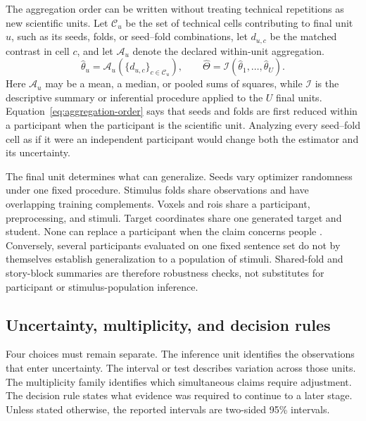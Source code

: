 The aggregation order can be written without treating technical repetitions as new scientific units.
Let \(\mathcal C_u\) be the set of technical cells contributing to final unit \(u\), such as its seeds, folds, or seed--fold combinations, let \(d_{u,c}\) be the matched contrast in cell \(c\), and let \(\mathcal A_u\) denote the declared within-unit aggregation.
\begin{equation}
  \widehat\theta_u
  =
  \mathcal A_u\!\left(\{d_{u,c}\}_{c\in\mathcal C_u}\right),
  \qquad
  \widehat\Theta
  =
  \mathcal I\!\left(\widehat\theta_1,\ldots,\widehat\theta_U\right).
  \label{eq:aggregation-order}
\end{equation}
Here \(\mathcal A_u\) may be a mean, a median, or pooled sums of squares, while \(\mathcal I\) is the descriptive summary or inferential procedure applied to the \(U\) final units.
Equation~\ref{eq:aggregation-order} says that seeds and folds are first reduced within a participant when the participant is the scientific unit.
Analyzing every seed--fold cell as if it were an independent participant would change both the estimator and its uncertainty.

The final unit determines what can generalize.
Seeds vary optimizer randomness under one fixed procedure.
Stimulus folds share observations and have overlapping training complements.
Voxels and \acp{roi} share a participant, preprocessing, and stimuli.
Target coordinates share one generated target and student.
None can replace a participant when the claim concerns people \autocite{lazic2010}.
Conversely, several participants evaluated on one fixed sentence set do not by themselves establish generalization to a population of stimuli.
Shared-fold and story-block summaries are therefore robustness checks, not substitutes for participant or stimulus-population inference. 

\subsection{Uncertainty, multiplicity, and decision rules}

Four choices must remain separate.
The inference unit identifies the observations that enter uncertainty.
The interval or test describes variation across those units.
The multiplicity family identifies which simultaneous claims require adjustment.
The decision rule states what evidence was required to continue to a later stage.
Unless stated otherwise, the reported intervals are two-sided 95\% intervals.

